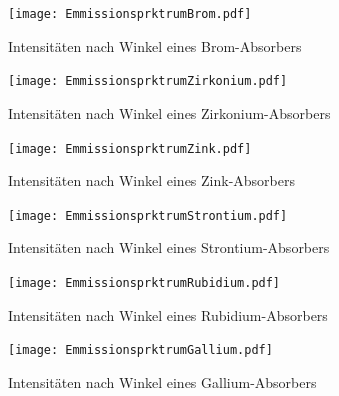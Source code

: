   \begin{figure}
    \centering
    \texttt{[image: EmmissionsprktrumBrom.pdf]}
    \caption{Intensitäten nach Winkel eines Brom-Absorbers}
    \label{fig:EmspektrumIII}
  \end{figure}

  \begin{figure}
    \centering
    \texttt{[image: EmmissionsprktrumZirkonium.pdf]}
    \caption{Intensitäten nach Winkel eines Zirkonium-Absorbers}
    \label{fig:EmspektrumIV}
  \end{figure}

  \begin{figure}
    \centering
    \texttt{[image: EmmissionsprktrumZink.pdf]}
    \caption{Intensitäten nach Winkel eines Zink-Absorbers}
    \label{fig:EmspektrumV}
  \end{figure}

  \begin{figure}
    \centering
    \texttt{[image: EmmissionsprktrumStrontium.pdf]}
    \caption{Intensitäten nach Winkel eines Strontium-Absorbers}
    \label{fig:EmspektrumVI}
  \end{figure}

  \begin{figure}
    \centering
    \texttt{[image: EmmissionsprktrumRubidium.pdf]}
    \caption{Intensitäten nach Winkel eines Rubidium-Absorbers}
    \label{fig:EmspektrumVII}
  \end{figure}

  \begin{figure}
    \centering
    \texttt{[image: EmmissionsprktrumGallium.pdf]}
    \caption{Intensitäten nach Winkel eines Gallium-Absorbers}
    \label{fig:EmspektrumVIII}
  \end{figure}
